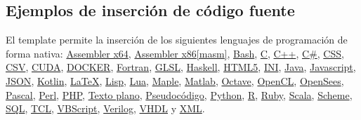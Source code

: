 		\lipsum[4]

		\begin{multicols}{2}

			\lipsum[4-5]
			
			
			\lipsum[6]
			
			
			\lipsum[2-3]

		\end{multicols}

	\subsection{Ejemplos de inserción de código fuente}

		\newcommand{\insertsrcmanual}[2]{\href{https://latex.ppizarror.com/informe.html?srctype=#1\#hlp-srccode}{#2}}

		El template permite la inserción de los siguientes lenguajes de programación de forma nativa: \insertsrcmanual{assemblerx64}{Assembler x64}, \insertsrcmanual{assemblerx86}{Assembler x86[masm]},  \insertsrcmanual{bash}{Bash}, \insertsrcmanual{c}{C}, \insertsrcmanual{cpp}{C++}, \insertsrcmanual{csharp}{C\#}, \insertsrcmanual{css}{CSS}, \insertsrcmanual{csv}{CSV}, \insertsrcmanual{cuda}{CUDA}, \insertsrcmanual{docker}{DOCKER}, \insertsrcmanual{fortran}{Fortran}, \insertsrcmanual{glsl}{GLSL}, \insertsrcmanual{haskell}{Haskell}, \insertsrcmanual{html5}{HTML5}, \insertsrcmanual{ini}{INI}, \insertsrcmanual{java}{Java}, \insertsrcmanual{js}{Javascript}, \insertsrcmanual{json}{JSON}, \insertsrcmanual{kotlin}{Kotlin}, \insertsrcmanual{latex}{LaTeX}, \insertsrcmanual{lisp}{Lisp}, \insertsrcmanual{lua}{Lua}, \insertsrcmanual{maple}{Maple}, \insertsrcmanual{matlab}{Matlab}, \insertsrcmanual{octave}{Octave}, \insertsrcmanual{opencl}{OpenCL}, \insertsrcmanual{opensees}{OpenSees}, \insertsrcmanual{pascal}{Pascal}, \insertsrcmanual{perl}{Perl}, \insertsrcmanual{php}{PHP}, \insertsrcmanual{plaintext}{Texto plano}, \insertsrcmanual{pseudocode}{Pseudocódigo}, \insertsrcmanual{python}{Python}, \insertsrcmanual{r}{R}, \insertsrcmanual{ruby}{Ruby}, \insertsrcmanual{scala}{Scala}, \insertsrcmanual{scheme}{Scheme}, \insertsrcmanual{sql}{SQL}, \insertsrcmanual{tcl}{TCL}, \insertsrcmanual{vbscript}{VBScript}, \insertsrcmanual{verilog}{Verilog}, \insertsrcmanual{vhdl}{VHDL} y \insertsrcmanual{xml}{XML}. \\
		
